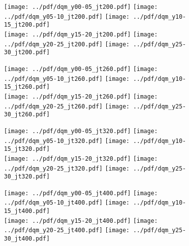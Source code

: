 \documentclass[landscape,10pt]{beamer} %
\begin{document}
\newpage

\begin{figure}[p]
\centering
\texttt{[image: ../pdf/dqm\_y00-05\_jt200.pdf]}
\texttt{[image: ../pdf/dqm\_y05-10\_jt200.pdf]}
\texttt{[image: ../pdf/dqm\_y10-15\_jt200.pdf]}\\
\texttt{[image: ../pdf/dqm\_y15-20\_jt200.pdf]}
\texttt{[image: ../pdf/dqm\_y20-25\_jt200.pdf]}
\texttt{[image: ../pdf/dqm\_y25-30\_jt200.pdf]}
\end{figure}

\newpage

\begin{figure}[p]
\centering
\texttt{[image: ../pdf/dqm\_y00-05\_jt260.pdf]}
\texttt{[image: ../pdf/dqm\_y05-10\_jt260.pdf]}
\texttt{[image: ../pdf/dqm\_y10-15\_jt260.pdf]}\\
\texttt{[image: ../pdf/dqm\_y15-20\_jt260.pdf]}
\texttt{[image: ../pdf/dqm\_y20-25\_jt260.pdf]}
\texttt{[image: ../pdf/dqm\_y25-30\_jt260.pdf]}
\end{figure}

\newpage

\begin{figure}[p]
\centering
\texttt{[image: ../pdf/dqm\_y00-05\_jt320.pdf]}
\texttt{[image: ../pdf/dqm\_y05-10\_jt320.pdf]}
\texttt{[image: ../pdf/dqm\_y10-15\_jt320.pdf]}\\
\texttt{[image: ../pdf/dqm\_y15-20\_jt320.pdf]}
\texttt{[image: ../pdf/dqm\_y20-25\_jt320.pdf]}
\texttt{[image: ../pdf/dqm\_y25-30\_jt320.pdf]}
\end{figure}

\newpage

\begin{figure}[p]
\centering
\texttt{[image: ../pdf/dqm\_y00-05\_jt400.pdf]}
\texttt{[image: ../pdf/dqm\_y05-10\_jt400.pdf]}
\texttt{[image: ../pdf/dqm\_y10-15\_jt400.pdf]}\\
\texttt{[image: ../pdf/dqm\_y15-20\_jt400.pdf]}
\texttt{[image: ../pdf/dqm\_y20-25\_jt400.pdf]}
\texttt{[image: ../pdf/dqm\_y25-30\_jt400.pdf]}
\end{figure}
\end{document}
